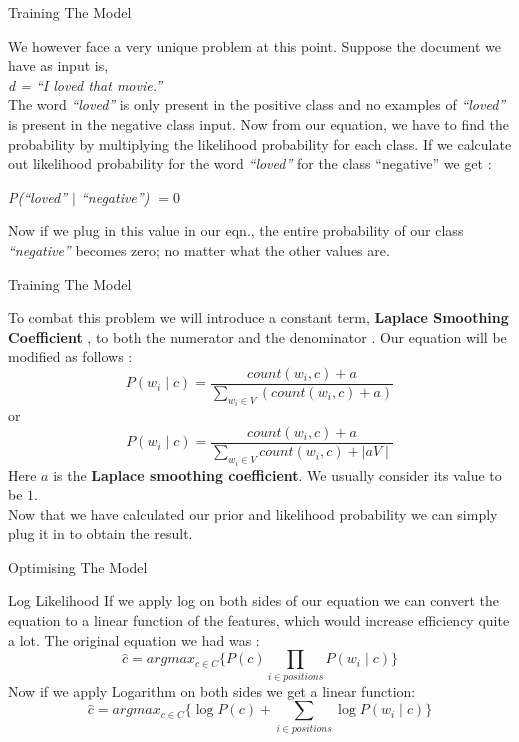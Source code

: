 \documentclass[usenames,dvipsnames]{beamer}
\begin{document}
\begin{frame}{Training The Model}
	\begin{block}{}
		We however face a very unique problem at this point. Suppose the document we have as input is, \\
		\textit{d = “I loved that movie.”} \\
		The word \textit{“loved”} is only present in the positive class and no examples of \textit{“loved”} is present in the negative class input. Now from our equation, we have to find the probability by multiplying the likelihood probability for each class. If we calculate out likelihood probability for the word \textit{“loved”} for the class “negative” we get $\colon$
		\begin{center}
		\textit{P(“loved” $\mid$ “negative”) $= 0$}
		\end{center}
	Now if we plug in this value in our eqn., the entire probability of our class \textit{“negative”} becomes zero; no matter what the other values are.
	\end{block}
\end{frame}
\begin{frame}{Training The Model}
	\begin{block}{}
		To combat this problem we will introduce a constant term, \textbf{Laplace Smoothing Coefficient} , to both the numerator and the denominator . Our equation will be modified as follows $\colon$
		$$ P(w_{i} \mid c) = \frac{count(w_{i},c)+a}{\sum_{w_{i} \in V}(count(w_{i},c)+a)}$$
		or
		$$  P(w_{i} \mid c) = \frac{count(w_{i},c)+a}{\sum_{w_{i} \in V}count(w_{i},c) + \mid aV \mid}$$
		Here $a$ is the \textbf{Laplace smoothing coefficient}. We usually consider its value to be $1$. \\
		Now that we have calculated our prior and likelihood probability we can simply plug it in to obtain the result.
	\end{block}
\end{frame}
\begin{frame}{Optimising The Model}
	\begin{block}{Log Likelihood}
		If we apply log on both sides of our equation we can convert the equation to a linear function of the features, which would increase efficiency quite a lot. The original equation we had was $\colon$
		$$\hat{c} = argmax_{c \in C} \{P(c)\prod _{i \in positions} P(w_{i} \mid c) \}$$
		Now if we apply Logarithm on both sides we get a linear function:
		\begin{equation}
		 \hat{c} =  argmax_{c \in C} \{ \log P(c) + \sum _{i \in positions} \log P(w_{i} \mid c) \}
		\end{equation}
	\end{block}
\end{frame}
\end{document}
